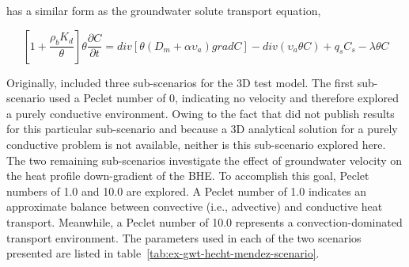 has a similar form as the groundwater solute transport equation,

\begin{equation*}
\left[ 1 + \frac{\rho_b K_d}{\theta} \right] \theta \frac{\partial  C}{\partial t}
= div \left[ \theta \left( D_m + \alpha \upsilon_a \right) grad C \right] - div \left( \upsilon_a \theta C \right) + q_s C_s - \lambda \theta C
\end{equation*}

Originally, \cite{hechtMendez2010} included three sub-scenarios for the 3D test model.  The first sub-scenario used a Peclet number of 0, indicating no velocity and therefore explored a purely conductive environment.  Owing to the fact that \citep{hechtMendez2010} did not publish results for this particular sub-scenario and because a 3D analytical solution for a purely conductive problem is not available, neither is this sub-scenario explored here.  The two remaining sub-scenarios investigate the effect of groundwater velocity on the heat profile down-gradient of the BHE.  To accomplish this goal, Peclet numbers of 1.0 and 10.0 are explored. A Peclet number of 1.0 indicates an approximate balance between convective (i.e., advective) and conductive heat transport.  Meanwhile, a Peclet number of 10.0 represents a convection-dominated transport environment.  The parameters used in each of the two scenarios presented are listed in table~\ref{tab:ex-gwt-hecht-mendez-scenario}.
